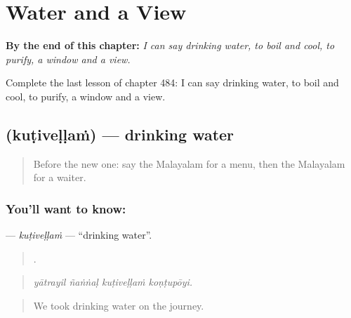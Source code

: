 
\chapter{Water and a View}
\label{ch:ml-water-and-a-view}

\begin{chapteropening}
\textbf{By the end of this chapter:} \emph{I can say drinking water, to boil and cool, to purify, a window and a view.}

Complete the last lesson of chapter 484: I can say drinking water, to boil and cool, to purify, a window and a view.
\end{chapteropening}

\section[\texorpdfstring{\ml{കുടിവെള്ളം} (kuṭiveḷḷaṁ)}{കുടിവെള്ളം (kuṭiveḷḷaṁ)}]{ (kuṭiveḷḷaṁ) — drinking water}

\label{lesson:ML-C484-kutivellam}



\begin{quote}
Before the new one: say the Malayalam for a menu, then the Malayalam for a waiter.
\end{quote}

\subsection*{You'll want to know: }
\textbf{} — \emph{kuṭiveḷḷaṁ} — \textquotedblleft{}drinking water\textquotedblright{}.

\begin{quote}
   .
\end{quote}

\begin{quote}
\emph{yātrayil ñaṅṅaḷ kuṭiveḷḷaṁ koṇṭupōyi.}
\end{quote}

\begin{quote}
We took drinking water on the journey.
\end{quote}

